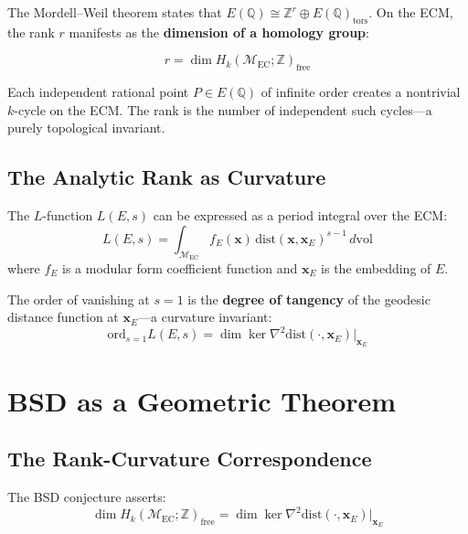 \documentclass{article}
\begin{document}
The Mordell--Weil theorem states that $E(\mathbb{Q}) \cong \mathbb{Z}^r
\oplus E(\mathbb{Q})_{\mathrm{tors}}$.  On the ECM, the rank $r$ manifests
as the \textbf{dimension of a homology group}:

\begin{equation}
r = \dim H_k(\mathcal{M}_{\mathrm{EC}}; \mathbb{Z})_{\mathrm{free}}
\end{equation}

Each independent rational point $P \in E(\mathbb{Q})$ of infinite order
creates a nontrivial $k$-cycle on the ECM.  The rank is the number of
independent such cycles---a purely topological invariant.

\subsection{The Analytic Rank as Curvature}

The $L$-function $L(E, s)$ can be expressed as a period integral over
the ECM:
\begin{equation}
L(E, s) = \int_{\mathcal{M}_{\mathrm{EC}}} f_E(\mathbf{x}) \,
  \mathrm{dist}(\mathbf{x}, \mathbf{x}_E)^{s-1} \, d\mathrm{vol}
\end{equation}
where $f_E$ is a modular form coefficient function and $\mathbf{x}_E$ is
the embedding of $E$.

The order of vanishing at $s = 1$ is the \textbf{degree of tangency} of the
geodesic distance function at $\mathbf{x}_E$---a curvature invariant:
\begin{equation}
\mathrm{ord}_{s=1} L(E, s) = \dim \ker \nabla^2 \mathrm{dist}(\cdot,
  \mathbf{x}_E) \big|_{\mathbf{x}_E}
\end{equation}

\section{BSD as a Geometric Theorem}
\label{sec:bsd-geometric}

\subsection{The Rank-Curvature Correspondence}

The BSD conjecture asserts:
\begin{equation}
\dim H_k(\mathcal{M}_{\mathrm{EC}}; \mathbb{Z})_{\mathrm{free}} =
\dim \ker \nabla^2 \mathrm{dist}(\cdot, \mathbf{x}_E) \big|_{\mathbf{x}_E}
\end{equation}
\end{document}
